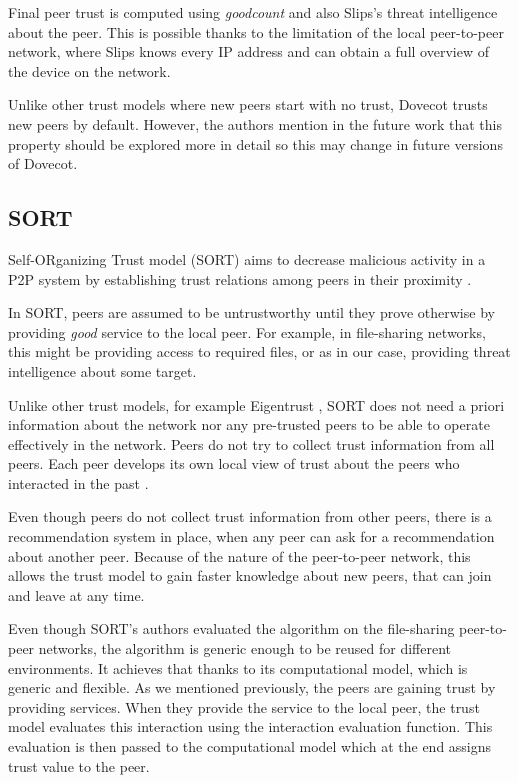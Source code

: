 Final peer trust is computed using \textit{goodcount} and also Slips's threat intelligence about the peer. 
This is possible thanks to the limitation of the local peer-to-peer network, where Slips knows every IP address and can obtain a full overview of the device on the network.

Unlike other trust models where new peers start with no trust, Dovecot trusts new peers by default. 
However, the authors mention in the future work that this property should be explored more in detail so this may change in future versions of Dovecot.

\subsection{SORT}
\label{subsec:sort}
Self-ORganizing Trust model (SORT) aims to decrease malicious activity in a P2P system by establishing trust relations among peers in their proximity \cite{sort}.

In SORT, peers are assumed to be untrustworthy until they prove otherwise by providing \textit{good} service to the local peer. 
For example, in file-sharing networks, this might be providing access to required files, or as in our case, providing threat intelligence about some target.

Unlike other trust models, for example Eigentrust \cite{kamvar2003eigentrust}, SORT does not need a priori information about the network nor any pre-trusted peers to be able to operate effectively in the network.
Peers do not try to collect trust information from all peers.
Each peer develops its own local view of trust about the peers who interacted in the past \cite{sort}.

Even though peers do not collect trust information from other peers, there is a recommendation system in place, when any peer can ask for a recommendation about another peer.
Because of the nature of the peer-to-peer network, this allows the trust model to gain faster knowledge about new peers, that can join and leave at any time.

Even though SORT's authors evaluated the algorithm on the file-sharing peer-to-peer networks, the algorithm is generic enough to be reused for different environments.
It achieves that thanks to its computational model, which is generic and flexible.
As we mentioned previously, the peers are gaining trust by providing services. 
When they provide the service to the local peer, the trust model evaluates this interaction using the interaction evaluation function.
This evaluation is then passed to the computational model which at the end assigns trust value to the peer.

